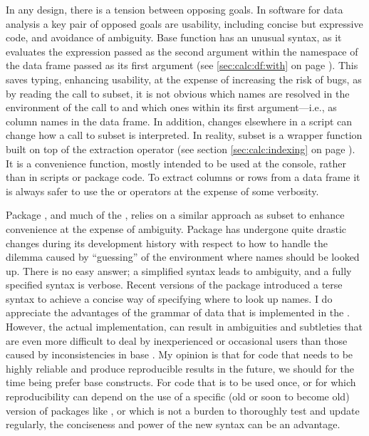 \documentclass[krantz2]{krantz}\usepackage{knitr}
\begin{document}
\begin{explainbox}
In any design, there is a tension between opposing goals. In software for data analysis a key pair of opposed goals are usability, including concise but expressive code, and avoidance of ambiguity. Base \Rlang function  has an unusual syntax, as it evaluates the expression passed as the second argument within the namespace of the data frame passed as its first argument (see \ref{sec:calc:df:with} on page \pageref{sec:calc:df:with}). This saves typing, enhancing usability, at the expense of increasing the risk of bugs, as by reading the call to subset, it is not obvious which names are resolved in the environment of the call to  and which ones within its first argument---i.e., as column names in the data frame. In addition, changes elsewhere in a script can change how a call to subset is interpreted. In reality, subset is a wrapper function built on top of the extraction operator \code{[ ]} (see section \ref{sec:calc:indexing} on page \pageref{sec:calc:indexing}). It is a convenience function, mostly intended to be used at the console, rather than in scripts or package code. To extract columns or rows from a data frame it is always safer to use the \Roperator{[ , ]} or \Roperator{[[ ]]} operators at the expense of some verbosity.

Package , and much of the , relies on a similar approach as subset to enhance convenience at the expense of ambiguity. Package  has undergone quite drastic changes during its development history with respect to how to handle the dilemma caused by ``guessing'' of the environment where names should be looked up. There is no easy answer; a simplified syntax leads to ambiguity, and a fully specified syntax is verbose. Recent versions of the package introduced a terse syntax to achieve a concise way of specifying where to look up names. I do appreciate the advantages of the grammar of data that is implemented in the . However, the actual implementation, can result in ambiguities and subtleties that are even more difficult to deal by inexperienced or occasional users than those caused by inconsistencies in base \Rlang. My opinion is that for code that needs to be highly reliable and produce reproducible results in the future, we should for the time being prefer base \Rlang constructs. For code that is to be used once, or for which reproducibility can depend on the use of a specific (old or soon to become old) version of packages like , or which is not a burden to thoroughly test and update regularly, the conciseness and power of the new syntax can be an advantage.
\end{explainbox}
\end{document}
